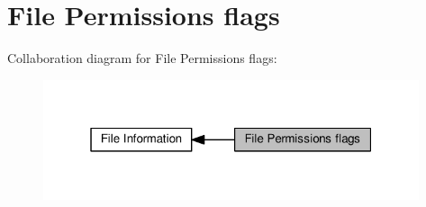 \hypertarget{group__apr__file__permissions}{}\section{File Permissions flags}
\label{group__apr__file__permissions}
Collaboration diagram for File Permissions flags\+:
\nopagebreak
\begin{figure}[H]
\begin{center}
\leavevmode
\includegraphics[width=313pt]{group__apr__file__permissions}
\end{center}
\end{figure}
